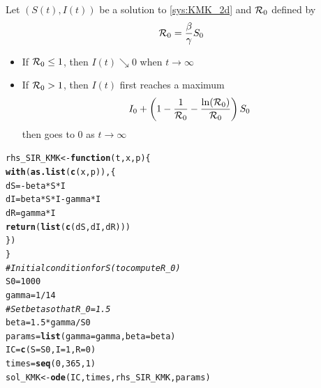 \documentclass[aspectratio=169]{beamer}\usepackage[]{graphicx}\usepackage[]{xcolor}
\makeatletter
\newcommand{\hlnum}[1]{\textcolor[rgb]{0.686,0.059,0.569}{#1}}%
\newcommand{\hlcom}[1]{\textcolor[rgb]{0.678,0.584,0.686}{\textit{#1}}}%
\newcommand{\hlopt}[1]{\textcolor[rgb]{0,0,0}{#1}}%
\newcommand{\hldef}[1]{\textcolor[rgb]{0.345,0.345,0.345}{#1}}%
\newcommand{\hlkwa}[1]{\textcolor[rgb]{0.161,0.373,0.58}{\textbf{#1}}}%
\newcommand{\hlkwb}[1]{\textcolor[rgb]{0.69,0.353,0.396}{#1}}%
\newcommand{\hlkwc}[1]{\textcolor[rgb]{0.333,0.667,0.333}{#1}}%
\newcommand{\hlkwd}[1]{\textcolor[rgb]{0.737,0.353,0.396}{\textbf{#1}}}%
\newenvironment{kframe}{%
 \def\at@end@of@kframe{}%
 \ifinner\ifhmode%
  \def\at@end@of@kframe{\end{minipage}}%
  \begin{minipage}{\columnwidth}%
 \fi\fi%
 \def\FrameCommand##1{\hskip\@totalleftmargin \hskip-\fboxsep
 \colorbox{shadecolor}{##1}\hskip-\fboxsep
     \hskip-\linewidth \hskip-\@totalleftmargin \hskip\columnwidth}%
 \MakeFramed {\advance\hsize-\width
   \@totalleftmargin\z@ \linewidth\hsize
   \@setminipage}}%
 {\par\unskip\endMakeFramed%
 \at@end@of@kframe}
\newenvironment{knitrout}{}{} %
\makeatother
\begin{document}
\begin{frame}{}
  \begin{theorem}
    Let $(S(t),I(t))$ be a solution to \eqref{sys:KMK_2d} and $\mathcal{R}_0$ defined by
    \begin{equation}\label{eq:R0_KMK}
    \mathcal{R}_0=\frac{\beta}{\gamma}S_0
    \end{equation}
    \vfill
    \begin{itemize}
      \item If $\mathcal{R}_0\leq 1$, then $I(t)\searrow 0$ when $t\to\infty$ 
      \item If $\mathcal{R}_0>1$, then $I(t)$ first reaches a maximum 
      \begin{equation}\label{eq:max_I}
        I_0+\left(
      1-\frac{1}{\mathcal{R}_0} - \frac{\ln(\mathcal{R}_0)}{\mathcal{R}_0}
      \right)S_0
      \end{equation}
      then goes to 0 as $t\to\infty$  
    \end{itemize}    
  \end{theorem}
\end{frame}

\begin{knitrout}
\color{fgcolor}\begin{kframe}
\begin{alltt}
\hldef{rhs_SIR_KMK} \hlkwb{<-} \hlkwa{function}\hldef{(}\hlkwc{t}\hldef{,} \hlkwc{x}\hldef{,} \hlkwc{p}\hldef{) \{}
  \hlkwd{with}\hldef{(}\hlkwd{as.list}\hldef{(}\hlkwd{c}\hldef{(x, p)), \{}
    \hldef{dS} \hlkwb{=} \hlopt{-} \hldef{beta} \hlopt{*} \hldef{S} \hlopt{*} \hldef{I}
    \hldef{dI} \hlkwb{=} \hldef{beta} \hlopt{*} \hldef{S} \hlopt{*} \hldef{I} \hlopt{-} \hldef{gamma} \hlopt{*} \hldef{I}
    \hldef{dR} \hlkwb{=} \hldef{gamma} \hlopt{*} \hldef{I}
    \hlkwd{return}\hldef{(}\hlkwd{list}\hldef{(}\hlkwd{c}\hldef{(dS, dI, dR)))}
  \hldef{\})}
\hldef{\}}
\hlcom{# Initial condition for S (to compute R_0)}
\hldef{S0} \hlkwb{=} \hlnum{1000}
\hldef{gamma} \hlkwb{=} \hlnum{1}\hlopt{/}\hlnum{14}
\hlcom{# Set beta so that R_0 = 1.5}
\hldef{beta} \hlkwb{=} \hlnum{1.5} \hlopt{*} \hldef{gamma} \hlopt{/} \hldef{S0}
\hldef{params} \hlkwb{=} \hlkwd{list}\hldef{(}\hlkwc{gamma} \hldef{= gamma,} \hlkwc{beta} \hldef{= beta)}
\hldef{IC} \hlkwb{=} \hlkwd{c}\hldef{(}\hlkwc{S} \hldef{= S0,} \hlkwc{I} \hldef{=} \hlnum{1}\hldef{,} \hlkwc{R} \hldef{=} \hlnum{0}\hldef{)}
\hldef{times} \hlkwb{=} \hlkwd{seq}\hldef{(}\hlnum{0}\hldef{,} \hlnum{365}\hldef{,} \hlnum{1}\hldef{)}
\hldef{sol_KMK} \hlkwb{<-} \hlkwd{ode}\hldef{(IC, times, rhs_SIR_KMK, params)}
\end{alltt}
\end{kframe}
\end{knitrout}
\end{document}
